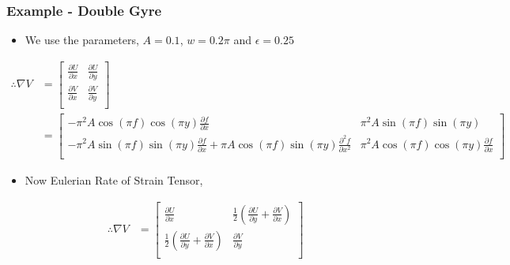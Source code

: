\documentclass[../presentation.tex]{subfiles}
\begin{document}
\begin{frame}
  \frametitle{Example - Double Gyre}

  \begin{itemize}
    \item We use the parameters, \(A = 0.1\), \(w = 0.2\pi\) and \(\epsilon = 0.25\)
  \end{itemize}
  
  {\tiny
    \begin{equation}
      \begin{aligned}
        \therefore \nabla V &= \begin{bmatrix}
          \frac{\partial U}{\partial x} & \frac{\partial U}{\partial y} \\[12pt]
          \frac{\partial V}{\partial x} & \frac{\partial V}{\partial y} \\
        \end{bmatrix} \\
        &= \begin{bmatrix}
          -\pi^2 A\cos(\pi f)\cos(\pi y) \frac{\partial f}{\partial x} & \pi^2 A\sin(\pi f)\sin(\pi y) \\[12pt]
          -\pi^2 A\sin(\pi f)\sin(\pi y)\frac{\partial f}{\partial x} + \pi A\cos(\pi f)\sin(\pi y) \frac{\partial^2 f}{\partial x^2} & \pi^2 A\cos(\pi f)\cos(\pi y)\frac{\partial f}{\partial x} \\
        \end{bmatrix}
      \end{aligned}
    \end{equation}
  }

  \begin{itemize}
    \item Now Eulerian Rate of Strain Tensor,
  \end{itemize}
  \begin{equation}
    \begin{aligned}
      \therefore \nabla V &= \begin{bmatrix}
        \frac{\partial U}{\partial x} & \frac{1}{2} (\frac{\partial U}{\partial y} + \frac{\partial V}{\partial x}) \\[12pt]
        \frac{1}{2} (\frac{\partial U}{\partial y} + \frac{\partial V}{\partial x}) & \frac{\partial V}{\partial y} \\
      \end{bmatrix} \\
    \end{aligned}
  \end{equation}
\end{frame}
\end{document}
